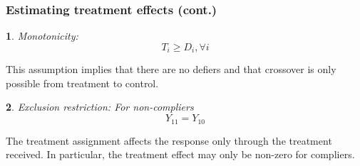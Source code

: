 \documentclass{beamer}
\makeatletter
\newtheorem*{assumption*}{\assumptionnumber}
\providecommand{\assumptionnumber}{}
\newenvironment{assumption}[2]
 {%
  \renewcommand{\assumptionnumber}{Assumption #1}%
  \begin{assumption*}%
  \protected@edef\@currentlabel{#1}%
 }
 {%
  \end{assumption*}
 }
\makeatother
\begin{document}
\begin{frame}
\frametitle{Estimating treatment effects (cont.)}
\begin{assumption}{6}{}\label{monotonicity}
Monotonicity: 
\begin{equation*}
T_i \geq D_i, \forall i
\end{equation*}
\end{assumption}
\noindent This assumption implies that there are no defiers and that crossover is only possible from treatment to control.
\begin{assumption}{7}{}\label{ER}
Exclusion restriction: For non-compliers
\begin{equation*}
Y_{11} = Y_{10}
\end{equation*}  
\end{assumption}
\noindent The treatment assignment affects the response only through the treatment received.  In particular, the treatment effect may only be non-zero for compliers.  
\end{frame}



		
\end{document}
